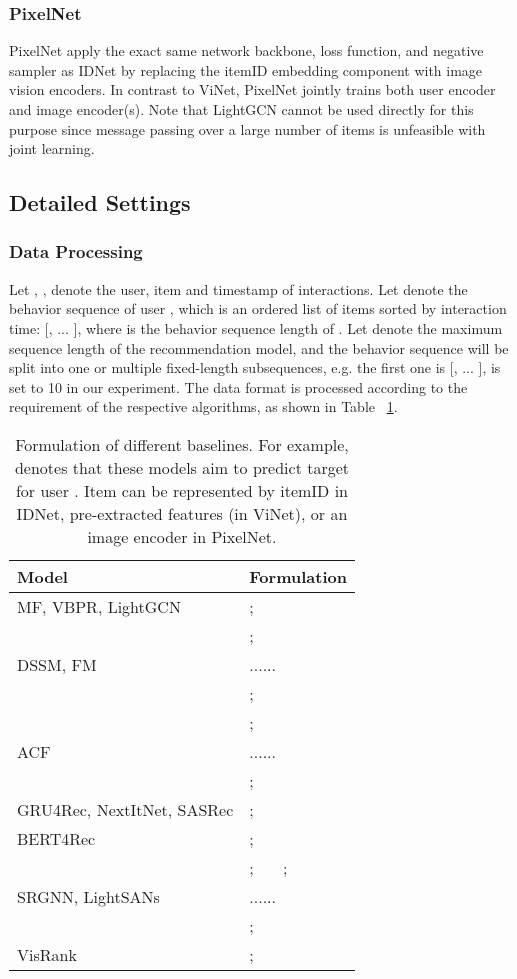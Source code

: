 \documentclass[sigconf]{acmart}
\begin{document}
\subsubsection{PixelNet}
PixelNet apply the exact same network backbone, loss function, and negative sampler as IDNet by replacing the itemID embedding component with image vision encoders. 
In contrast to ViNet, PixelNet jointly  trains both user encoder and image encoder(s).
Note that LightGCN cannot be used directly for this purpose since message passing over a large number of items is unfeasible with  joint learning.


\subsection{Detailed Settings}

\subsubsection{Data Processing}
Let , ,  denote the user, item and timestamp of interactions. 
Let  denote the behavior sequence of user , which is an ordered  list of items sorted by interaction time: [,  ... ], where  is the behavior sequence length of  . Let  denote the maximum sequence length of the recommendation model, and the behavior sequence will be split into one or multiple fixed-length subsequences, e.g. the first one is [,  ... ],  is set to 10 in our experiment. The data format is processed according to the requirement of the respective algorithms, as shown in Table ~\ref{tab:dataprocess}.

\begin{table}[t]
	\centering
	\caption{Formulation of different baselines. For example,   denotes that these models aim to predict target  for user . Item  can be represented by itemID in IDNet, pre-extracted features (in ViNet), or an image encoder in PixelNet.}	
	\label{tab:dataprocess}
		\begin{tabular}{ l l }
			\toprule
			Model &  Formulation   \\
			\midrule
			MF, VBPR,   LightGCN &  ; \\
			
			\midrule
			\multirow{3}{*}{DSSM, FM} & ;    \\
			& ...... \\
			& ; \\
\midrule
			\multirow{3}{*}{ACF}& ; \\
			& ...... \\
			& ;\\
			\midrule
			GRU4Rec, NextItNet, SASRec   & ; \\
			\midrule
			BERT4Rec&  ; \\
			
			\midrule
			\multirow{3}{*}{SRGNN, LightSANs} &   ; \ \  \   ;  \\
			& ...... \\
			& ; \\
			\midrule
			VisRank&  ; \\
			
			\bottomrule
		\end{tabular}
\end{table}	
\end{document}
